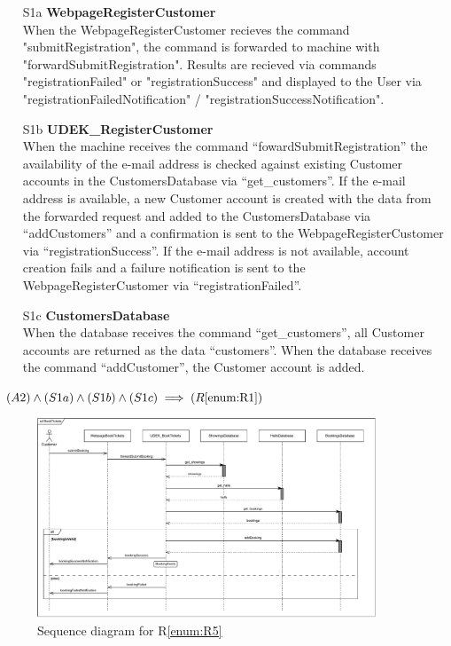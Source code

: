 \documentclass[a4paper,10pt,titlepage,bibtotoc,bibtotocnumbered]{scrreprt}
\begin{document}
\begin{itemize}
    \item[S1a] \textbf{WebpageRegisterCustomer}\\
    When the WebpageRegisterCustomer recieves the command "submitRegistration", the command is forwarded to machine with "forwardSubmitRegistration".
    Results are recieved via commands "registrationFailed" or "registrationSuccess" and displayed to the User via "registrationFailedNotification" / "registrationSuccessNotification".

    \item[S1b] \textbf{UDEK\_RegisterCustomer}\\
    When the machine receives the command ``fowardSubmitRegistration'' the availability of the e-mail address is checked against existing Customer accounts in the CustomersDatabase via ``get\_customers''.
    If the e-mail address is available, a new Customer account is created with the data from the forwarded request and added to the CustomersDatabase via ``addCustomers'' and a confirmation is sent to the WebpageRegisterCustomer via ``registrationSuccess''.
    If the e-mail address is not available, account creation fails and a failure notification is sent to the WebpageRegisterCustomer via ``registrationFailed''.

    \item[S1c] \textbf{CustomersDatabase}\\
    When the database receives the command ``get\_customers'', all Customer accounts are returned as the data ``customers''.
    When the database receives the command ``addCustomer'', the Customer account is added.
\end{itemize}

$(A2) \land (S1a) \land (S1b) \land (S1c) \implies (R\ref{enum:R1})$

\begin{figure}[H]
\centering
\includegraphics[width=0.9\textwidth]{figures/05/a05_sequence_diagram_r05.pdf}
\caption{Sequence diagram for R\ref{enum:R5}}
\label{figure:sdR5}
\end{figure}
\end{document}
